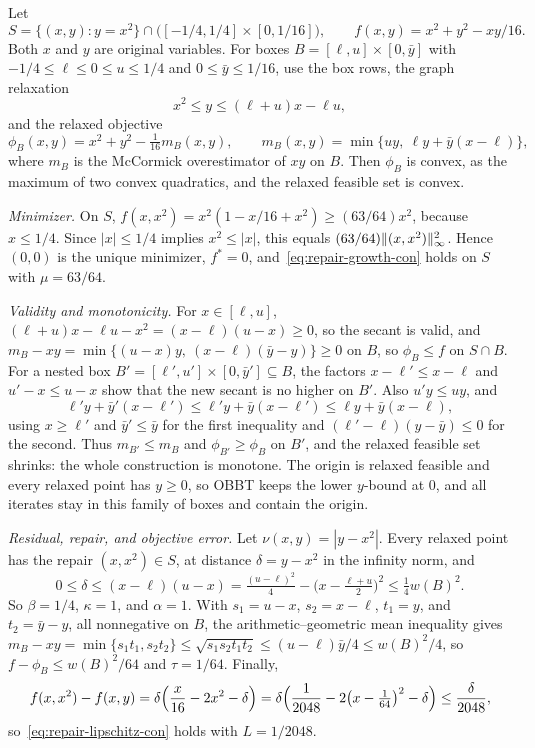 \begin{example}\label{ex:graph-con}
Let
\[
 S=\{(x,y):y=x^2\}\cap\bigl([-1/4,1/4]\times[0,1/16]\bigr),\qquad
 f(x,y)=x^2+y^2-xy/16 .
\]
Both $x$ and $y$ are original variables. For boxes
$B=[\ell,u]\times[0,\bar y]$ with $-1/4\le\ell\le0\le u\le1/4$ and
$0\le\bar y\le1/16$, use the box rows, the graph relaxation
\[
 x^2\le y\le(\ell+u)x-\ell u,
\]
and the relaxed objective
\[
 \phi_B(x,y)=x^2+y^2-\tfrac1{16}m_B(x,y),\qquad
 m_B(x,y)=\min\{uy,\ \ell y+\bar y(x-\ell)\},
\]
where $m_B$ is the McCormick overestimator of $xy$ on $B$. Then $\phi_B$ is
convex, as the maximum of two convex quadratics, and the relaxed feasible
set is convex.

\emph{Minimizer.} On $S$, $f(x,x^2)=x^2(1-x/16+x^2)\ge(63/64)x^2$, because
$x\le1/4$. Since $|x|\le1/4$ implies $x^2\le|x|$, this equals
$(63/64)\lVert (x,x^2)\rVert_\infty^2$. Hence $(0,0)$ is the unique minimizer,
$f^*=0$, and~\eqref{eq:repair-growth-con} holds on $S$ with $\mu=63/64$.

\emph{Validity and monotonicity.} For $x\in[\ell,u]$,
$(\ell+u)x-\ell u-x^2=(x-\ell)(u-x)\ge0$, so the secant is valid, and
$m_B-xy=\min\{(u-x)y,\ (x-\ell)(\bar y-y)\}\ge0$ on $B$, so $\phi_B\le f$
on $S\cap B$. For a nested box $B'=[\ell',u']\times[0,\bar y']\subseteq B$,
the factors $x-\ell'\le x-\ell$ and $u'-x\le u-x$ show that the new secant
is no higher on $B'$. Also $u'y\le uy$, and
\[
 \ell'y+\bar y'(x-\ell')\le\ell'y+\bar y(x-\ell')\le\ell y+\bar y(x-\ell),
\]
using $x\ge\ell'$ and $\bar y'\le\bar y$ for the first inequality and
$(\ell'-\ell)(y-\bar y)\le0$ for the second. Thus $m_{B'}\le m_B$ and
$\phi_{B'}\ge\phi_B$ on $B'$, and the relaxed feasible set shrinks: the
whole construction is monotone. The origin is relaxed feasible and every
relaxed point has $y\ge0$, so OBBT keeps the lower $y$-bound at $0$, and all
iterates stay in this family of boxes and contain the origin.

\emph{Residual, repair, and objective error.} Let $\nu(x,y)=|y-x^2|$. Every
relaxed point has the repair $(x,x^2)\in S$, at distance
$\delta=y-x^2$ in the infinity norm, and
\[
 0\le\delta\le(x-\ell)(u-x)=\tfrac{(u-\ell)^2}4-\bigl(x-\tfrac{\ell+u}2\bigr)^2
 \le\tfrac14w(B)^2 .
\]
So $\beta=1/4$, $\kappa=1$, and $\alpha=1$. With $s_1=u-x$, $s_2=x-\ell$,
$t_1=y$, and $t_2=\bar y-y$, all nonnegative on $B$, the
arithmetic--geometric mean inequality gives
$m_B-xy=\min\{s_1t_1,s_2t_2\}\le\sqrt{s_1s_2t_1t_2}\le(u-\ell)\bar y/4
\le w(B)^2/4$, so $f-\phi_B\le w(B)^2/64$ and $\tau=1/64$. Finally,
\[
 f(x,x^2)-f(x,y)=\delta\Bigl(\frac x{16}-2x^2-\delta\Bigr)
 =\delta\Bigl(\frac1{2048}-2\bigl(x-\tfrac1{64}\bigr)^2-\delta\Bigr)
 \le\frac{\delta}{2048},
\]
so~\eqref{eq:repair-lipschitz-con} holds with $L=1/2048$.


\end{example}
